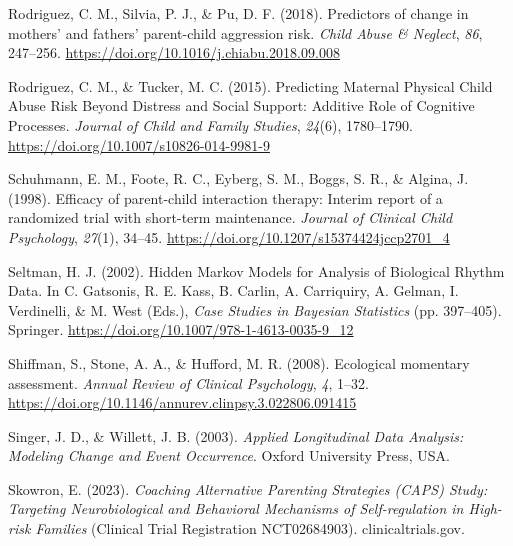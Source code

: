 \documentclass[12pt]{./styles/outhesis}
\begin{document}
\leavevmode{}%
Rodriguez, C. M., Silvia, P. J., \& Pu, D. F. (2018). Predictors of
change in mothers' and fathers' parent-child aggression risk.
\emph{Child Abuse \& Neglect}, \emph{86}, 247--256.
\url{https://doi.org/10.1016/j.chiabu.2018.09.008}

\leavevmode{}%
Rodriguez, C. M., \& Tucker, M. C. (2015). Predicting {Maternal Physical
Child Abuse Risk Beyond Distress} and {Social Support}: {Additive Role}
of {Cognitive Processes}. \emph{Journal of Child and Family Studies},
\emph{24}(6), 1780--1790.
\url{https://doi.org/10.1007/s10826-014-9981-9}

\leavevmode{}%
Schuhmann, E. M., Foote, R. C., Eyberg, S. M., Boggs, S. R., \& Algina,
J. (1998). Efficacy of parent-child interaction therapy: Interim report
of a randomized trial with short-term maintenance. \emph{Journal of
Clinical Child Psychology}, \emph{27}(1), 34--45.
\url{https://doi.org/10.1207/s15374424jccp2701_4}

\leavevmode{}%
Seltman, H. J. (2002). Hidden {Markov Models} for {Analysis} of
{Biological Rhythm Data}. In C. Gatsonis, R. E. Kass, B. Carlin, A.
Carriquiry, A. Gelman, I. Verdinelli, \& M. West (Eds.), \emph{Case
{Studies} in {Bayesian Statistics}} (pp. 397--405). Springer.
\url{https://doi.org/10.1007/978-1-4613-0035-9_12}

\leavevmode{}%
Shiffman, S., Stone, A. A., \& Hufford, M. R. (2008). Ecological
momentary assessment. \emph{Annual Review of Clinical Psychology},
\emph{4}, 1--32.
\url{https://doi.org/10.1146/annurev.clinpsy.3.022806.091415}

\leavevmode{}%
Singer, J. D., \& Willett, J. B. (2003). \emph{Applied {Longitudinal
Data Analysis}: {Modeling Change} and {Event Occurrence}}. Oxford
University Press, USA.

\leavevmode{}%
Skowron, E. (2023). \emph{Coaching {Alternative Parenting Strategies}
({CAPS}) {Study}: {Targeting Neurobiological} and {Behavioral
Mechanisms} of {Self-regulation} in {High-risk Families}} (Clinical
Trial Registration NCT02684903). clinicaltrials.gov.
\end{document}
